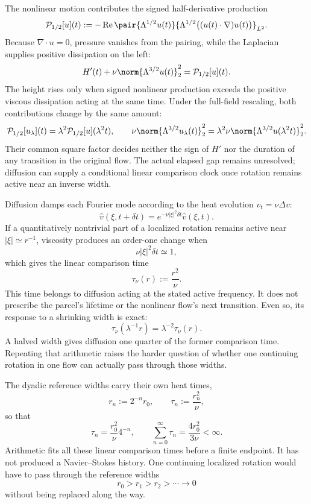 
The nonlinear motion contributes the signed half-derivative production
\[
  \mathcal P_{1/2}[u](t)
  :=
  -\operatorname{Re}
  \pair
    {\Lambda^{1/2}u(t)}
    {\Lambda^{1/2}\bigl((u(t)\cdot\nabla)u(t)\bigr)}_{L^2}.
\]
Because \(\nabla\cdot u=0\), pressure vanishes from the pairing, while the Laplacian supplies positive dissipation on the left:
\[
  H'(t)
  +
  \nu\norm{\Lambda^{3/2}u(t)}_2^2
  =
  \mathcal P_{1/2}[u](t).
\]
The height rises only when signed nonlinear production exceeds the positive viscous dissipation acting at the same time. Under the full-field rescaling, both contributions change by the same amount:
\[
  \mathcal P_{1/2}[u_\lambda](t)
  =
  \lambda^2\mathcal P_{1/2}[u](\lambda^2t),
  \qquad
  \nu\norm{\Lambda^{3/2}u_\lambda(t)}_2^2
  =
  \lambda^2\nu\norm{\Lambda^{3/2}u(\lambda^2t)}_2^2.
\]
Their common square factor decides neither the sign of \(H'\) nor the duration of any transition in the original flow. The actual elapsed gap remains unresolved; diffusion can supply a conditional linear comparison clock once rotation remains active near an inverse width.


Diffusion damps each Fourier mode according to the heat evolution \(v_t=\nu\Delta v\):
\[
  \widehat v(\xi,t+\delta t)
  =
  e^{-\nu|\xi|^2\delta t}\widehat v(\xi,t).
\]
If a quantitatively nontrivial part of a localized rotation remains active near \(|\xi|\simeq r^{-1}\), viscosity produces an order-one change when
\[
  \nu|\xi|^2\delta t\simeq1,
\]
which gives the linear comparison time
\[
  \tau_\nu(r)
  :=
  \frac{r^2}{\nu}.
\]
This time belongs to diffusion acting at the stated active frequency. It does not prescribe the parcel's lifetime or the nonlinear flow's next transition. Even so, its response to a shrinking width is exact:
\[
  \tau_\nu(\lambda^{-1}r)
  =
  \lambda^{-2}\tau_\nu(r).
\]
A halved width gives diffusion one quarter of the former comparison time. Repeating that arithmetic raises the harder question of whether one continuing rotation in one flow can actually pass through those widths.


The dyadic reference widths carry their own heat times,
\[
  r_n:=2^{-n}r_0,
  \qquad
  \tau_n:=\frac{r_n^2}{\nu},
\]
so that
\[
  \tau_n
  =
  \frac{r_0^2}{\nu}4^{-n},
  \qquad
  \sum_{n=0}^{\infty}\tau_n
  =
  \frac{4r_0^2}{3\nu}
  <
  \infty.
\]
Arithmetic fits all these linear comparison times before a finite endpoint. It has not produced a Navier--Stokes history. One continuing localized rotation would have to pass through the reference widths
\[
  r_0>r_1>r_2>\cdots\longrightarrow0
\]
without being replaced along the way.

